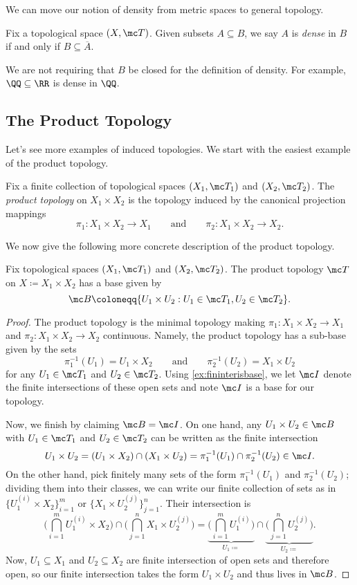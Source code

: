 \documentclass[../notes.tex]{subfiles}
\begin{document}
We can move our notion of density from metric spaces to general topology.
\begin{defi}[Dense]
	Fix a topological space $(X,\mc T)$. Given subsets $A\subseteq B$, we say $A$ is \textit{dense} in $B$ if and only if $B\subseteq\overline A$.
\end{defi}
\begin{remark}
	We are not requiring that $B$ be closed for the definition of density. For example, $\QQ\subseteq\RR$ is dense in $\QQ$.
\end{remark}

\subsection{The Product Topology}
Let's see more examples of induced topologies. We start with the easiest example of the product topology.
\begin{defihelper}
	Fix a finite collection of topological spaces $(X_1,\mc T_1)$ and $(X_2,\mc T_2)$. The \textit{product topology} on $X_1\times X_2$ is the topology induced by the canonical projection mappings
	\[\pi_1\colon X_1\times X_2\to X_1\qquad\text{and}\qquad\pi_2\colon X_1\times X_2\to X_2.\]
\end{defihelper}
We now give the following more concrete description of the product topology.
\begin{lemma} \label{lem:twoprodtop}
	Fix topological spaces $(X_1,\mc T_1)$ and $(X_2,\mc T_2)$. The product topology $\mc T$ on $X\coloneqq X_1\times X_2$ has a base given by
	\[\mc B\coloneqq\{U_1\times U_2:U_1\in\mc T_1,U_2\in\mc T_2\}.\]
\end{lemma}
\begin{proof}
	The product topology is the minimal topology making $\pi_1\colon X_1\times X_2\to X_1$ and $\pi_2\colon X_1\times X_2\to X_2$ continuous. Namely, the product topology has a sub-base given by the sets
	\[\pi_1^{-1}(U_1)=U_1\times X_2\qquad\text{and}\qquad\pi_2^{-1}(U_2)=X_1\times U_2\]
	for any $U_1\in\mc T_1$ and $U_2\in\mc T_2$. Using \autoref{ex:fininterisbase}, we let $\mc I$ denote the finite intersections of these open sets and note $\mc I$ is a base for our topology.
	
	Now, we finish by claiming $\mc B=\mc I$. On one hand, any $U_1\times U_2\in\mc B$ with $U_1\in\mc T_1$ and $U_2\in\mc T_2$ can be written as the finite intersection
	\[U_1\times U_2=(U_1\times X_2)\cap(X_1\times U_2)=\pi_1^{-1}(U_1)\cap\pi_2^{-1}(U_2)\in\mc I.\]
	On the other hand, pick finitely many sets of the form $\pi_1^{-1}(U_1)$ and $\pi_2^{-1}(U_2)$; dividing them into their classes, we can write our finite collection of sets as in $\{U_1^{(i)}\times X_2\}_{i=1}^m$ or $\{X_1\times U_2^{(j)}\}_{j=1}^n$. Their intersection is
	\[\Bigg(\bigcap_{i=1}^mU_1^{(i)}\times X_2\Bigg)\cap\Bigg(\bigcap_{j=1}^nX_1\times U_2^{(j)}\Bigg)=\underbrace{\Bigg(\bigcap_{i=1}^mU_1^{(i)}\Bigg)}_{U_1\coloneqq}\cap\underbrace{\Bigg(\bigcap_{j=1}^nU_2^{(j)}\Bigg)}_{U_2\coloneqq}.\]
	Now, $U_1\subseteq X_1$ and $U_2\subseteq X_2$ are finite intersection of open sets and therefore open, so our finite intersection takes the form $U_1\times U_2$ and thus lives in $\mc B$.
\end{proof}
\end{document}
